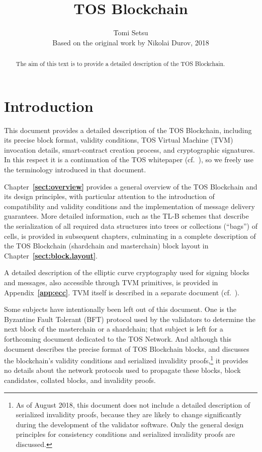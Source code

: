 \documentclass[12pt,oneside]{article}
\title{TOS Blockchain}
\author{Tomi Setsu\\[0.3em]
\small Based on the original work by Nikolai Durov, 2018}
\def\refpoint#1{{\rm\textbf{\ref{#1}}}}
\let\ptref=\refpoint
\def\markbothsame#1{\fancyhead[C]{#1}}
\begin{document}
\maketitle

\begin{abstract}
  The aim of this text is to provide a detailed description of the
  TOS Blockchain.
\end{abstract}

\section*{Introduction}
\markbothsame{Introduction}

This document provides a detailed description of the TOS Blockchain, including its precise block format, validity conditions, TOS Virtual Machine (TVM) invocation details, smart-contract creation process, and cryptographic signatures. In this respect it is a continuation of the TOS whitepaper (cf.~\cite{TOS}), so we freely use the terminology introduced in that document.

Chapter~\ptref{sect:overview} provides a general overview of the TOS Blockchain and its design principles, with particular attention to the introduction of compatibility and validity conditions and the implementation of message delivery guarantees. More detailed information, such as the TL-B schemes that describe the serialization of all required data structures into trees or collections (``bags'') of cells, is provided in subsequent chapters, culminating in a complete description of the TOS Blockchain (shardchain and masterchain) block layout in Chapter~\ptref{sect:block.layout}.

A detailed description of the elliptic curve cryptography used for signing blocks and messages, also accessible through TVM primitives, is provided in Appendix~\ptref{app:ecc}. TVM itself is described in a separate document (cf.~\cite{TVM}).

Some subjects have intentionally been left out of this document. One is the Byzantine Fault Tolerant (BFT) protocol used by the validators to determine the next block of the masterchain or a shardchain; that subject is left for a forthcoming document dedicated to the TOS Network. And although this document describes the precise format of TOS Blockchain blocks, and discusses the blockchain's validity conditions and serialized invalidity proofs,\footnote{As of August 2018, this document does not include a detailed description of serialized invalidity proofs, because they are likely to change significantly during the development of the validator software. Only the general design principles for consistency conditions and serialized invalidity proofs are discussed.}  it provides no details about the network protocols used to propagate these blocks, block candidates, collated blocks, and invalidity proofs.
\end{document}
